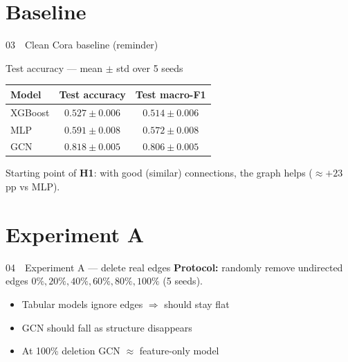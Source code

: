 \documentclass[
  english,
  aspectratio=169,
]{beamer}
\begin{document}
\section{Baseline}

\begin{frame}{03~~Clean Cora baseline (reminder)}
  \begin{block}{Test accuracy --- mean $\pm$ std over 5 seeds}
    \renewcommand{\arraystretch}{1.2}
    \begin{tabular}{lcc}
      \textbf{Model} & \textbf{Test accuracy} & \textbf{Test macro-F1} \\
      \hline
      XGBoost & $0.527 \pm 0.006$ & $0.514 \pm 0.006$ \\
      MLP & $0.591 \pm 0.008$ & $0.572 \pm 0.008$ \\
      GCN & $\mathbf{0.818 \pm 0.005}$ & $\mathbf{0.806 \pm 0.005}$ \\
    \end{tabular}
  \end{block}

  \vspace{0.5em}
  Starting point of \textbf{H1}: with good (similar) connections, the graph helps
  ($\approx +23$\,pp vs MLP).
\end{frame}

\section{Experiment A}

\begin{frame}{04~~Experiment A --- delete real edges}
  \textbf{Protocol:} randomly remove undirected edges
  $0\%, 20\%, 40\%, 60\%, 80\%, 100\%$ (5 seeds).

  \begin{itemize}
    \item Tabular models ignore edges $\Rightarrow$ should stay flat
    \item GCN should fall as structure disappears
    \item At 100\% deletion GCN $\approx$ feature-only model
  \end{itemize}
\end{frame}
\end{document}
